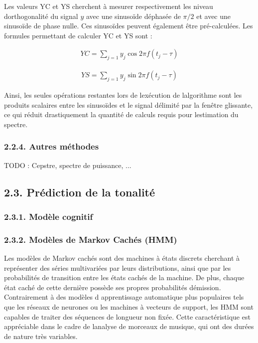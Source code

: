 \documentclass[letterpaper]{article}
\begin{document}
Les valeurs YC et YS cherchent à mesurer respectivement les niveau d\textquotesingle orthogonalité du signal $y$ avec une sinusoïde déphasée de $\pi / 2$
et avec une sinusoïde de phase nulle. Ces sinusoïdes peuvent également être pré-calculées. Les formules permettant de calculer YC et YS sont :

\begin{align}
YC = \sum\limits_{j=1} y_{j}\cos 2\pi f (t_{j} - \tau)
\end{align}

\begin{align}
YS = \sum\limits_{j=1} y_{j}\sin 2\pi f (t_{j} - \tau)
\end{align}

Ainsi, les seules opérations restantes lors de l\textquotesingle exécution de l\textquotesingle algorithme sont les produits scalaires entre les
sinusoïdes et le signal délimité par la fenêtre glissante, ce qui réduit drastiquement la quantité de calculs requis pour l\textquotesingle estimation du spectre.

\subsubsection*{2.2.4. Autres méthodes}

TODO : Cepstre, spectre de puissance, ...

\subsection*{2.3. Prédiction de la tonalité}

\subsubsection*{2.3.1. Modèle cognitif}

\subsubsection*{2.3.2. Modèles de Markov Cachés (HMM)}

Les modèles de Markov cachés sont des machines à états discrets cherchant à représenter des séries multivariées par
leurs distributions, ainsi que par les probabilités de transition entre les états cachés de la machine. De plus, chaque état
caché de cette dernière possède ses propres probabilités d\textquotesingle émission. Contrairement à des modèles d\textquotesingle
apprentissage automatique plus populaires tels que les réseaux de neurones ou les machines à vecteurs de support,
les HMM sont capables de traiter des séquences de longueur non fixée. Cette caractéristique est appréciable dans le cadre
de l\textquotesingle analyse de morceaux de musique, qui ont des durées de nature très variables.
\end{document}
